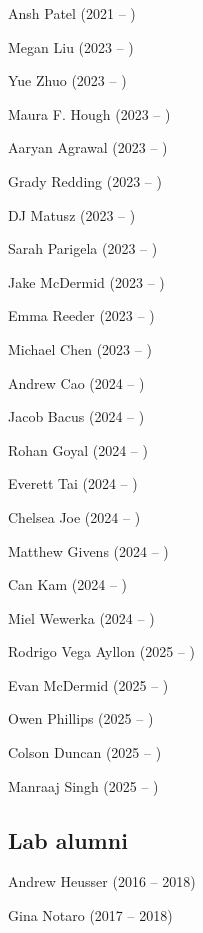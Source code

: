 \documentclass{tufte-book} %
\begin{document}
\begin{fullwidth}
\begin{multicols}{2}\raggedcolumns
\begin{list}{\quad}{}
\item Ansh Patel (2021 -- )
\item Megan Liu (2023 -- )
\item Yue Zhuo (2023 -- )
\item Maura F. Hough (2023 -- )
\item Aaryan Agrawal (2023 -- )
\item Grady Redding (2023 -- )
\item DJ Matusz (2023 -- )
\item Sarah Parigela (2023 -- )
\item Jake McDermid (2023 -- )
\item Emma Reeder (2023 -- )
\item Michael Chen (2023 -- )
\item Andrew Cao (2024 -- )
\item Jacob Bacus (2024 -- )
\item Rohan Goyal (2024 -- )
\item Everett Tai (2024 -- )
\item Chelsea Joe (2024 -- )
\item Matthew Givens (2024 -- )
\item Can Kam (2024 -- )
\item Miel Wewerka (2024 -- )
\item Rodrigo Vega Ayllon (2025 -- )
\item Evan McDermid (2025 -- )
\item Owen Phillips (2025 -- )
\item Colson Duncan (2025 -- )
\item Manraaj Singh (2025 -- )
\end{list}
\end{multicols}

\newpage

\subsection{Lab alumni}
\begin{multicols}{2}\raggedcolumns
\begin{list}{\quad}{}
\item Andrew Heusser (2016 -- 2018)
\item Gina Notaro (2017 -- 2018)
\end{list}
\end{multicols}


\end{fullwidth}
\end{document}
